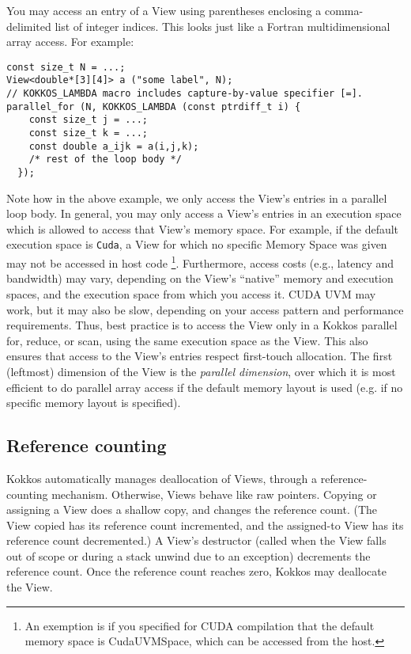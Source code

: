 You may access an entry of a View using parentheses enclosing a
comma-delimited list of integer indices.  This looks just like a
Fortran multidimensional array access.  For example:
\begin{lstlisting}
const size_t N = ...;
View<double*[3][4]> a ("some label", N);
// KOKKOS_LAMBDA macro includes capture-by-value specifier [=].
parallel_for (N, KOKKOS_LAMBDA (const ptrdiff_t i) {
    const size_t j = ...;
    const size_t k = ...;
    const double a_ijk = a(i,j,k);
    /* rest of the loop body */
  });
\end{lstlisting}
Note how in the above example, we only access the View's entries in a
parallel loop body.  In general, you may only access a View's entries
in an execution space which is allowed to access that View's memory
space.  For example, if the default execution space is \lstinline!Cuda!, 
a View for which no specific Memory Space was given may not be accessed 
in host code \footnote{An exemption is if you specified for CUDA compilation
that the default memory space is CudaUVMSpace, which can be accessed from 
the host.}.
Furthermore, access costs (e.g., latency and
bandwidth) may vary, depending on the View's ``native'' memory and
execution spaces, and the execution space from which you access it.
CUDA UVM may work, but it may also be slow, depending on your access
pattern and performance requirements.  Thus, best practice is to
access the View only in a Kokkos parallel for, reduce, or scan, using
the same execution space as the View.  This also ensures that access
to the View's entries respect first-touch allocation.  The first
(leftmost) dimension of the View is the \emph{parallel dimension},
over which it is most efficient to do parallel array access if the 
default memory layout is used (e.g. if no specific memory layout is 
specified).

\subsection{Reference counting}

Kokkos automatically manages deallocation of Views, through a
reference-counting mechanism.  Otherwise, Views behave like raw
pointers.  Copying or assigning a View does a shallow copy, and
changes the reference count.  (The View copied has its reference count
incremented, and the assigned-to View has its reference count
decremented.)  A View's destructor (called when the View falls out of
scope or during a stack unwind due to an exception) decrements the
reference count.  Once the reference count reaches zero, Kokkos may
deallocate the View.

